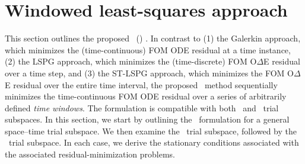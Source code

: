 \section{Windowed least-squares approach}\label{sec:tclspg} 
This section
outlines the proposed \methodNameLower\ 
(\methodAcronym) \approachKwd. In contrast to (1) the Galerkin approach, 
which minimizes the (time-continuous) FOM ODE residual at a time instance, 
(2) the LSPG approach, 
which minimizes
the (time-discrete) FOM O$\Delta$E residual 
over a time step, and (3) the ST-LSPG approach,  
which minimizes
the  FOM O$\Delta$E residual 
over the entire time interval, the proposed \methodAcronym\ method sequentially minimizes the 
time-continuous FOM ODE residual over a series of arbitrarily defined
\textit{time windows}. The formulation is compatible with both \spatialAcronym\ and \spaceTimeAcronym\ trial subspaces. 
In this section, we start by outlining the \methodAcronym\ formulation  
for a general space--time trial subspace. We then examine the \spatialAcronym\ 
trial subspace, followed by the \spaceTimeAcronym\ trial subspace. In each case, we derive the stationary conditions 
associated with the associated residual-minimization problems.

%
